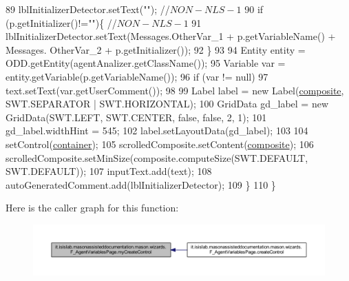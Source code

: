 \begin{DoxyCode}
89             lblInitializerDetector.setText(\textcolor{stringliteral}{""}); \textcolor{comment}{//$NON-NLS-1$}
90             \textcolor{keywordflow}{if} (p.getInitializer()!=\textcolor{stringliteral}{""})\{ \textcolor{comment}{//$NON-NLS-1$}
91                 lblInitializerDetector.setText(Messages.OtherVar\_1 + p.getVariableName() + Messages.
      OtherVar\_2 + p.getInitializer());
92             \}
93             
94             Entity entity = ODD.getEntity(agentAnalizer.getClassName());
95             Variable var = entity.getVariable(p.getVariableName());
96             \textcolor{keywordflow}{if} (var != null)
97                 text.setText(var.getUserComment());
98             
99             Label label = \textcolor{keyword}{new} Label(\hyperlink{classit_1_1isislab_1_1masonassisteddocumentation_1_1mason_1_1wizards_1_1_f___agent_variables_page_ae1c0cb2824f39253ba724603c4ba6920}{composite}, SWT.SEPARATOR | SWT.HORIZONTAL);
100             GridData gd\_label = \textcolor{keyword}{new} GridData(SWT.LEFT, SWT.CENTER, \textcolor{keyword}{false}, \textcolor{keyword}{false}, 2, 1);
101             gd\_label.widthHint = 545;
102             label.setLayoutData(gd\_label);
103             
104             setControl(\hyperlink{classit_1_1isislab_1_1masonassisteddocumentation_1_1mason_1_1wizards_1_1_f___agent_variables_page_a69defe28748ba6ba72b8c09e3b213245}{container});
105             scrolledComposite.setContent(\hyperlink{classit_1_1isislab_1_1masonassisteddocumentation_1_1mason_1_1wizards_1_1_f___agent_variables_page_ae1c0cb2824f39253ba724603c4ba6920}{composite});
106             scrolledComposite.setMinSize(composite.computeSize(SWT.DEFAULT, SWT.DEFAULT));  
107             inputText.add(text);
108             autoGeneratedComment.add(lblInitializerDetector);
109         \}
110     \}
\end{DoxyCode}


Here is the caller graph for this function\-:
\nopagebreak
\begin{figure}[H]
\begin{center}
\leavevmode
\includegraphics[width=350pt]{classit_1_1isislab_1_1masonassisteddocumentation_1_1mason_1_1wizards_1_1_f___agent_variables_page_a275d67efa29411a7afc3ee12531b4f3b_icgraph}
\end{center}
\end{figure}




